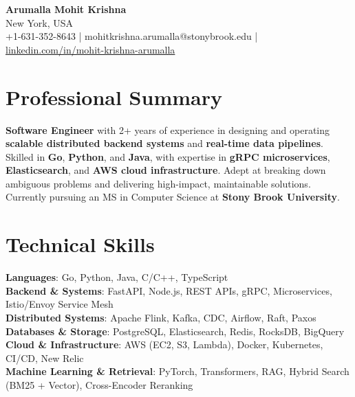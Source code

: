 \documentclass[letterpaper,11pt]{article}
\begin{document}
\begin{center}
  {\Large \textbf{Arumalla Mohit Krishna}} \\
  New York, USA \\
  +1-631-352-8643 \enspace | \enspace mohitkrishna.arumalla@stonybrook.edu \enspace | \enspace \href{https://www.linkedin.com/in/mohit-krishna-arumalla}{linkedin.com/in/mohit-krishna-arumalla}
\end{center}

\section{Professional Summary}
  \begin{itemize}[leftmargin=0.15in, label={}]
    \small{\item{
     \textbf{Software Engineer} with 2+ years of experience in designing and operating \textbf{scalable distributed backend systems} and \textbf{real-time data pipelines}. Skilled in \textbf{Go}, \textbf{Python}, and \textbf{Java}, with expertise in \textbf{gRPC microservices}, \textbf{Elasticsearch}, and \textbf{AWS cloud infrastructure}. Adept at breaking down ambiguous problems and delivering high-impact, maintainable solutions. Currently pursuing an MS in Computer Science at \textbf{Stony Brook University}.
    }}
  \end{itemize}
\vspace{-16pt}

\section{Technical Skills}
 \begin{itemize}[leftmargin=0.15in, label={}]
    \small{\item{
     \textbf{Languages}: Go, Python, Java, C/C++, TypeScript \\
     \textbf{Backend \& Systems}: FastAPI, Node.js, REST APIs, gRPC, Microservices, Istio/Envoy Service Mesh \\
     \textbf{Distributed Systems}: Apache Flink, Kafka, CDC, Airflow, Raft, Paxos \\
     \textbf{Databases \& Storage}: PostgreSQL, Elasticsearch, Redis, RocksDB, BigQuery \\
     \textbf{Cloud \& Infrastructure}: AWS (EC2, S3, Lambda), Docker, Kubernetes, CI/CD, New Relic \\
     \textbf{Machine Learning \& Retrieval}: PyTorch, Transformers, RAG, Hybrid Search (BM25 + Vector), Cross-Encoder Reranking
    }}
 \end{itemize}
\vspace{-16pt}
\end{document}
